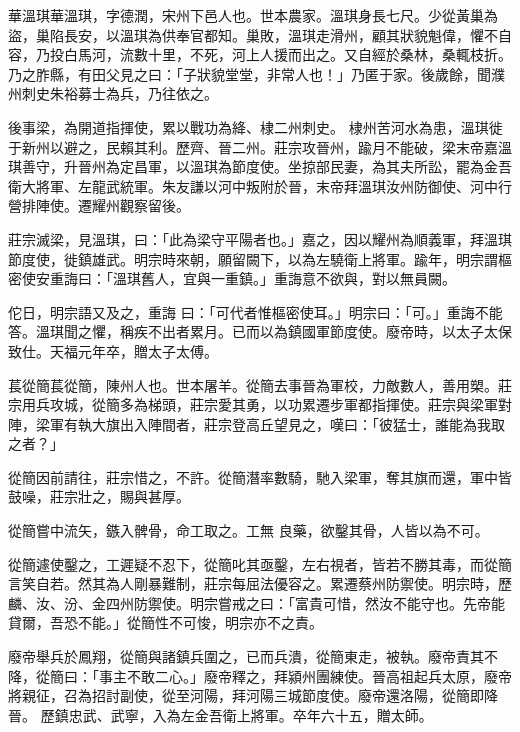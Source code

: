 
\begin{pinyinscope}

 華溫琪華溫琪，字德潤，宋州下邑人也。世本農家。溫琪身長七尺。少從黃巢為盜，巢陷長安，以溫琪為供奉官都知。巢敗，溫琪走滑州，顧其狀貌魁偉，懼不自容，乃投白馬河，流數十里，不死，河上人援而出之。又自經於桑林，桑輒枝折。乃之胙縣，有田父見之曰：「子狀貌堂堂，非常人也！」乃匿于家。後歲餘，聞濮州刺史朱裕募士為兵，乃往依之。



 後事梁，為開道指揮使，累以戰功為絳、棣二州刺史。
 棣州苦河水為患，溫琪徙于新州以避之，民賴其利。歷齊、晉二州。莊宗攻晉州，踰月不能破，梁末帝嘉溫琪善守，升晉州為定昌軍，以溫琪為節度使。坐掠部民妻，為其夫所訟，罷為金吾衛大將軍、左龍武統軍。朱友謙以河中叛附於晉，末帝拜溫琪汝州防御使、河中行營排陣使。遷耀州觀察留後。



 莊宗滅梁，見溫琪，曰：「此為梁守平陽者也。」嘉之，因以耀州為順義軍，拜溫琪節度使，徙鎮雄武。明宗時來朝，願留闕下，以為左驍衛上將軍。踰年，明宗謂樞密使安重誨曰：「溫琪舊人，宜與一重鎮。」重誨意不欲與，對以無員闕。



 佗日，明宗語又及之，重誨
 曰：「可代者惟樞密使耳。」明宗曰：「可。」重誨不能答。溫琪聞之懼，稱疾不出者累月。已而以為鎮國軍節度使。廢帝時，以太子太保致仕。天福元年卒，贈太子太傅。



 萇從簡萇從簡，陳州人也。世本屠羊。從簡去事晉為軍校，力敵數人，善用槊。莊宗用兵攻城，從簡多為梯頭，莊宗愛其勇，以功累遷步軍都指揮使。莊宗與梁軍對陣，梁軍有執大旗出入陣間者，莊宗登高丘望見之，嘆曰：「彼猛士，誰能為我取之者？」



 從簡因前請往，莊宗惜之，不許。從簡潛率數騎，馳入梁軍，奪其旗而還，軍中皆鼓噪，莊宗壯之，賜與甚厚。



 從簡嘗中流矢，鏃入髀骨，命工取之。工無
 良藥，欲鑿其骨，人皆以為不可。



 從簡遽使鑿之，工遲疑不忍下，從簡叱其亟鑿，左右視者，皆若不勝其毒，而從簡言笑自若。然其為人剛暴難制，莊宗每屈法優容之。累遷蔡州防禦使。明宗時，歷麟、汝、汾、金四州防禦使。明宗嘗戒之曰：「富貴可惜，然汝不能守也。先帝能貸爾，吾恐不能。」從簡性不可悛，明宗亦不之責。



 廢帝舉兵於鳳翔，從簡與諸鎮兵圍之，已而兵潰，從簡東走，被執。廢帝責其不降，從簡曰：「事主不敢二心。」廢帝釋之，拜潁州團練使。晉高祖起兵太原，廢帝將親征，召為招討副使，從至河陽，拜河陽三城節度使。廢帝還洛陽，從簡即降晉。
 歷鎮忠武、武寧，入為左金吾衛上將軍。卒年六十五，贈太師。




\end{pinyinscope}
